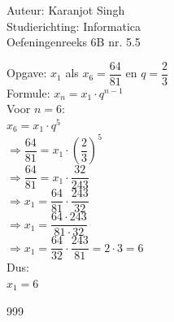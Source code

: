 \documentclass[a4paper]{article}
\begin{document}
\noindent \large Auteur: Karanjot Singh\\
\noindent \large Studierichting: Informatica\\
\noindent \large Oefeningenreeks 6B nr. 5.5\\

\normalsize

Opgave: $x_1$ als $x_6 = \dfrac{64}{81}$ en $q = \dfrac{2}{3}$\\

Formule: $x_n = x_1 \cdot q^{n - 1}$\\

Voor $n = 6$:\\

$x_6 = x_1 \cdot q^5$\\

$\Rightarrow \dfrac{64}{81} = x_1 \cdot \left( \dfrac{2}{3} \right)^5$\\

$\Rightarrow \dfrac{64}{81} = x_1 \cdot \dfrac{32}{243}$\\

$\Rightarrow x_1 = \dfrac{64}{81} \cdot \dfrac{243}{32}$\\

$\Rightarrow x_1 = \dfrac{64 \cdot 243}{81 \cdot 32}$\\

$\Rightarrow x_1 = \dfrac{64}{32} \cdot \dfrac{243}{81} = 2 \cdot 3 = 6$\\

Dus:\\

$x_1 = 6$\\

\begin{thebibliography}{999}
\end{thebibliography}
\end{document}
